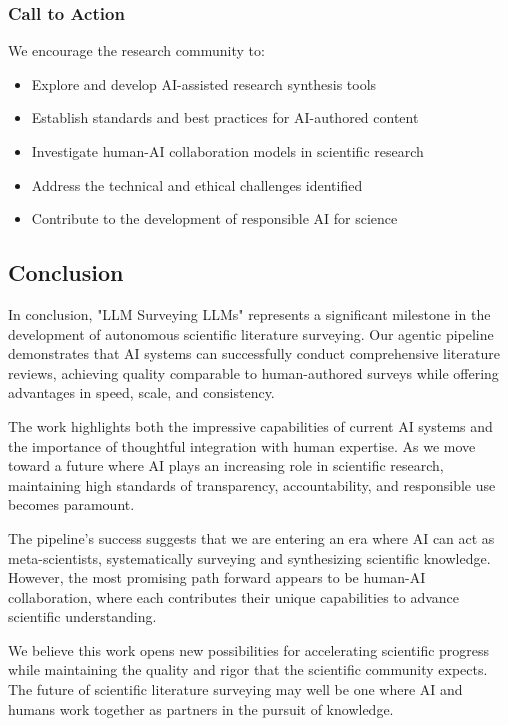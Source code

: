 \subsubsection{Call to Action}

We encourage the research community to:
\begin{itemize}
    \item Explore and develop AI-assisted research synthesis tools
    \item Establish standards and best practices for AI-authored content
    \item Investigate human-AI collaboration models in scientific research
    \item Address the technical and ethical challenges identified
    \item Contribute to the development of responsible AI for science
\end{itemize}

\subsection{Conclusion}

In conclusion, "LLM Surveying LLMs" represents a significant milestone in the development of autonomous scientific literature surveying. Our agentic pipeline demonstrates that AI systems can successfully conduct comprehensive literature reviews, achieving quality comparable to human-authored surveys while offering advantages in speed, scale, and consistency.

The work highlights both the impressive capabilities of current AI systems and the importance of thoughtful integration with human expertise. As we move toward a future where AI plays an increasing role in scientific research, maintaining high standards of transparency, accountability, and responsible use becomes paramount.

The pipeline's success suggests that we are entering an era where AI can act as meta-scientists, systematically surveying and synthesizing scientific knowledge. However, the most promising path forward appears to be human-AI collaboration, where each contributes their unique capabilities to advance scientific understanding.

We believe this work opens new possibilities for accelerating scientific progress while maintaining the quality and rigor that the scientific community expects. The future of scientific literature surveying may well be one where AI and humans work together as partners in the pursuit of knowledge.

